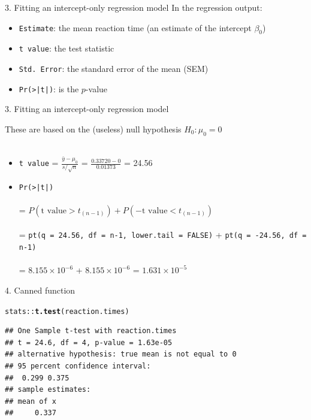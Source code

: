 \documentclass[10pt]{beamer}\usepackage[]{graphicx}\usepackage[]{color}
\makeatletter
\newcommand{\hlopt}[1]{\textcolor[rgb]{0,0,0}{#1}}%
\newcommand{\hlstd}[1]{\textcolor[rgb]{0.345,0.345,0.345}{#1}}%
\newcommand{\hlkwd}[1]{\textcolor[rgb]{0.737,0.353,0.396}{\textbf{#1}}}%
\newenvironment{kframe}{%
 \def\at@end@of@kframe{}%
 \ifinner\ifhmode%
  \def\at@end@of@kframe{\end{minipage}}%
  \begin{minipage}{\columnwidth}%
 \fi\fi%
 \def\FrameCommand##1{\hskip\@totalleftmargin \hskip-\fboxsep
 \colorbox{shadecolor}{##1}\hskip-\fboxsep
     \hskip-\linewidth \hskip-\@totalleftmargin \hskip\columnwidth}%
 \MakeFramed {\advance\hsize-\width
   \@totalleftmargin\z@ \linewidth\hsize
   \@setminipage}}%
 {\par\unskip\endMakeFramed%
 \at@end@of@kframe}
\newenvironment{knitrout}{}{} %
\makeatother
\begin{document}
\begin{frame}[fragile]{3. Fitting an intercept-only regression model}
	In the regression output:
	\begin{itemize}
		\setlength\itemsep{1em}
		\item \texttt{Estimate}: the mean reaction time (an estimate of the intercept $\beta_0$)
		\item \texttt{t value}: the test statistic 
		\item \texttt{Std. Error}: the standard error of the mean (SEM)
		\item \texttt{Pr(>|t|)}: is the $p$-value
	\end{itemize} 
	
	
\end{frame}


\begin{frame}[fragile]{3. Fitting an intercept-only regression model}
	

	
	\small
	These are based on the (useless) null hypothesis $H_0: \mu_0 = 0$ \\ \ \\
	
	\begin{itemize}
		\item \texttt{t value} = $\frac{\bar{y} - \mu_0}{s / \sqrt{n}}$ = $\frac{0.33720 - 0}{0.01373}$ = 24.56
		\item \texttt{Pr(>|t|)} \\ \ \\
		= $P(\textrm{t value} > t_{(n-1)}) + P(-\textrm{t value} < t_{(n-1)})$ \\ \ \\
		= \small{\texttt{pt(q = 24.56, df = n-1, lower.tail = FALSE)} +  \texttt{pt(q = -24.56, df = n-1)}} \\ \ \\
		= \ensuremath{8.155\times 10^{-6}} + \ensuremath{8.155\times 10^{-6}} = \ensuremath{1.631\times 10^{-5}}
	\end{itemize}
	
	
\end{frame}



\begin{frame}[fragile]{4. Canned function}
	
\begin{knitrout}\tiny
{}\color{fgcolor}\begin{kframe}
\begin{alltt}
\hlstd{stats}\hlopt{::}\hlkwd{t.test}\hlstd{(reaction.times)}
\end{alltt}
\begin{verbatim}
## One Sample t-test with reaction.times 
## t = 24.6, df = 4, p-value = 1.63e-05
## alternative hypothesis: true mean is not equal to 0 
## 95 percent confidence interval:
##  0.299 0.375 
## sample estimates:
## mean of x 
##     0.337
\end{verbatim}
\end{kframe}
\end{knitrout}
	
\end{frame}
\end{document}
